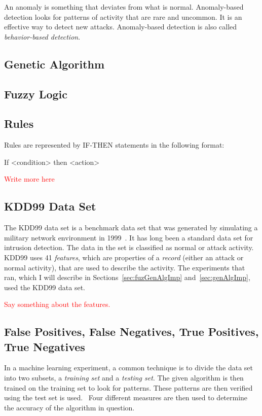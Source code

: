 \documentclass{sig-alternate}
\newcommand{\mycomment}[1]{\textcolor{red}{#1}}
\begin{document}
An anomaly is something that deviates from what is normal. Anomaly-based detection looks for patterns of activity that are rare and uncommon. It is an effective way to detect new attacks. Anomaly-based detection is also called \emph{behavior-based detection}.~\cite{DBLP:journals/corr/abs-1204-1336}




\subsection{Genetic Algorithm}

\subsection{Fuzzy Logic}


\subsection{Rules}
Rules are represented by IF-THEN statements in the following format:

If <condition> then <action>

\mycomment{Write more here}




\subsection{KDD99 Data Set}
The KDD99 data set is a benchmark data set that was generated by simulating a military network environment in 1999~\cite{6559603}. It has long been a standard data set for intrusion detection. The data in the set is classified as normal or attack activity. KDD99 uses 41 \emph{features}, which are properties of a \emph{record} (either an attack or normal activity), that are used to describe the activity. The experiments that~\cite{6559603, DBLP:journals/corr/abs-1204-1336} ran, which I will describe in Sections~\ref{sec:fuzGenAlgImp} and~\ref{sec:genAlgImp}, used the KDD99 data set.

\mycomment{Say something about the features.}




\subsection{False Positives, False Negatives, True Positives, True Negatives}
\label{sec:PosNeg}
In a machine learning experiment, a common technique is to divide the data set into two subsets, a \emph{training set} and a \emph{testing set}. The given algorithm is then trained on the training set to look for patterns. These patterns are then verified using the test set is used.~\cite{bc1_ecindm} Four different measures are then used to determine the accuracy of the algorithm in question.
\end{document}
